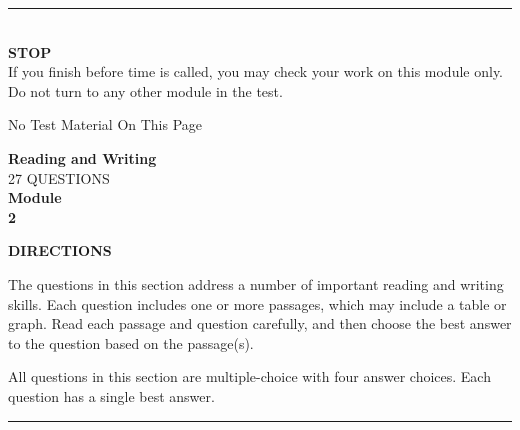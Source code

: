 \documentclass[11pt, twocolumn]{article}
\newcommand{\currentmodulename}{}
\newcommand{\setmodulename}[1]{\renewcommand{\currentmodulename}{#1}}
\newcounter{questionnum}
\begin{document}
\onecolumn
\thispagestyle{plainpage}
\vfill
\begin{center}
\rule{0.8\textwidth}{0.5pt}\\[6pt]
{\large\textbf{STOP}}\\[4pt]
{\small If you finish before time is called, you may check your work on this module only.\\
Do not turn to any other module in the test.}
\end{center}
\onecolumn
\newpage
\thispagestyle{plainpage}
\begin{center}
\vspace*{3in}
{\large No Test Material On This Page}
\end{center}

\setmodulename{Easy}
\onecolumn
\newpage
\thispagestyle{plainpage}
\setcounter{questionnum}{0}
\begin{center}
{\Large\textbf{Reading and Writing}}\\[6pt]
{\large 27 QUESTIONS}\\[4pt]
{\large\textbf{Module}}\\
{\Large\textbf{2}}
\end{center}
\vspace{8pt}
\textbf{DIRECTIONS}

The questions in this section address a number of important reading and writing skills. Each question includes one or more passages, which may include a table or graph. Read each passage and question carefully, and then choose the best answer to the question based on the passage(s).

All questions in this section are multiple-choice with four answer choices. Each question has a single best answer.
\vspace{8pt}
\hrule
\vspace{8pt}
\twocolumn
\pagestyle{questionpage}
\end{document}
